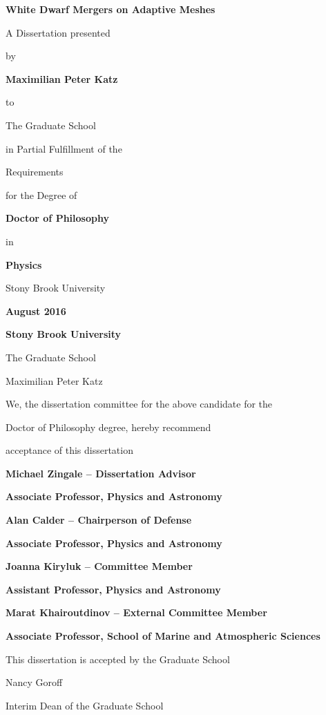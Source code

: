 \documentclass[12pt]{article}
\begin{document}
\vspace*{3\baselineskip}
\centerline{\bf{White Dwarf Mergers on Adaptive Meshes}}
\vspace*{1\baselineskip}
\centerline{A Dissertation presented}
\vspace*{1\baselineskip}
\centerline{by}
\vspace*{1\baselineskip}
\centerline{\bf{Maximilian Peter Katz}}
\vspace*{1\baselineskip}
\centerline{to}
\vspace*{1\baselineskip}
\centerline{The Graduate School}
\vspace*{1\baselineskip}
\centerline{in Partial Fulfillment of the}
\vspace*{1\baselineskip}
\centerline{Requirements}
\vspace*{1\baselineskip}
\centerline{for the Degree of}
\vspace*{1\baselineskip}
\centerline{\bf{Doctor of Philosophy}}
\vspace*{1\baselineskip}
\centerline{in}
\vspace*{1\baselineskip}
\centerline{\bf{Physics}}
\vspace*{2\baselineskip}
\centerline{Stony Brook University}
\vspace*{2\baselineskip}
\centerline{\bf{August 2016}}

\newpage
{}
\setcounter{page}{2}

\centerline{\bf{Stony Brook University}}
\vspace*{1\baselineskip}
\centerline{The Graduate School}
\vspace*{2\baselineskip}
\centerline{Maximilian Peter Katz}
\vspace*{2\baselineskip}
\centerline{We, the dissertation committee for the above candidate for the}
\vspace*{1\baselineskip}
\centerline{Doctor of Philosophy degree, hereby recommend}
\vspace*{1\baselineskip}
\centerline{acceptance of this dissertation}
\vspace*{2\baselineskip}
\centerline{\bf{Michael Zingale -- Dissertation Advisor}}
\centerline{\bf{Associate Professor, Physics and Astronomy}}
\vspace*{2\baselineskip}
\centerline{\bf{Alan Calder -- Chairperson of Defense}}
\centerline{\bf{Associate Professor, Physics and Astronomy}}
\vspace*{2\baselineskip}
\centerline{\bf{Joanna Kiryluk -- Committee Member}}
\centerline{\bf{Assistant Professor, Physics and Astronomy}}
\vspace*{2\baselineskip}
\centerline{\bf{Marat Khairoutdinov -- External Committee Member}}
\centerline{\bf{Associate Professor, School of Marine and Atmospheric Sciences}}
\vspace*{2\baselineskip}
\centerline{This dissertation is accepted by the Graduate School}
\vspace*{3\baselineskip}
\centerline{Nancy Goroff}
\centerline{Interim Dean of the Graduate School}
\end{document}
